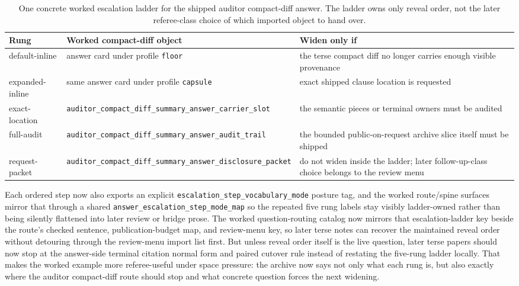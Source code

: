 \documentclass[11pt]{article}
\begin{document}
\begin{table}[t]
\centering
\small
\begin{tabularx}{\linewidth}{@{}L M Y@{}}
\toprule
Rung & Worked compact-diff object & Widen only if \\
\midrule
\textsf{default-inline} & answer card under profile \nolinkurl{floor} & the terse compact diff no longer carries enough visible provenance \\
\textsf{expanded-inline} & same answer card under profile \nolinkurl{capsule} & exact shipped clause location is requested \\
\textsf{exact-location} & \nolinkurl{auditor_compact_diff_summary_answer_carrier_slot} & the semantic pieces or terminal owners must be audited \\
\textsf{full-audit} & \nolinkurl{auditor_compact_diff_summary_answer_audit_trail} & the bounded public-on-request archive slice itself must be shipped \\
\textsf{request-packet} & \nolinkurl{auditor_compact_diff_summary_answer_disclosure_packet} & do not widen inside the ladder; later follow-up-class choice belongs to the review menu \\
\bottomrule
\end{tabularx}
\caption{One concrete worked escalation ladder for the shipped auditor compact-diff answer. The ladder owns only reveal order, not the later referee-class choice of which imported object to hand over.}
\label{tab:workedcompactdiffescalationladder}
\end{table}

Each ordered step now also exports an explicit \nolinkurl{escalation_step_vocabulary_mode} posture tag, and the worked route/spine surfaces mirror that through a shared \nolinkurl{answer_escalation_step_mode_map} so the repeated five rung labels stay visibly ladder-owned rather than being silently flattened into later review or bridge prose. The worked question-routing catalog now mirrors that escalation-ladder key beside the route's checked sentence, publication-budget map, and review-menu key, so later terse notes can recover the maintained reveal order without detouring through the review-menu import list first. But unless reveal order itself is the live question, later terse papers should now stop at the answer-side terminal citation normal form and paired cutover rule instead of restating the five-rung ladder locally.\cite{series:challengeanswerreviewmenus,series:publicrequestresponsepacketrefreshresponsepacketclosureverdicts,series:pairedterminalcitationdiscipline,series:pairedterminalcutoverrules} That makes the worked example more referee-useful under space pressure: the archive now says not only what each rung is, but also exactly where the auditor compact-diff route should stop and what concrete question forces the next widening.
\end{document}
